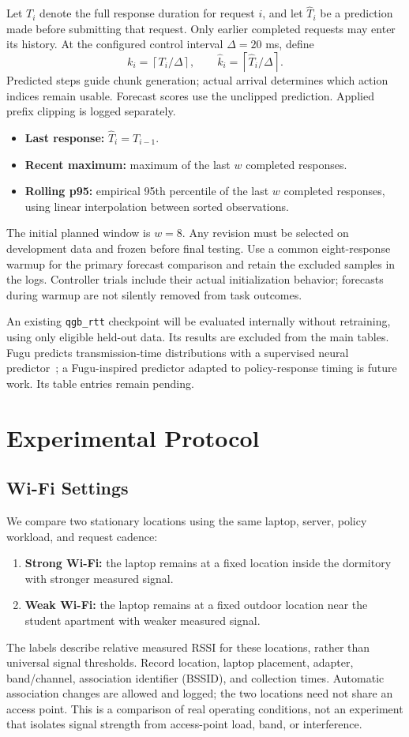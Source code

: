 \documentclass[11pt]{article}
\newcommand{\method}[1]{\texttt{#1}}
\begin{document}
Let $T_i$ denote the full response duration for request $i$, and let $\hat T_i$ be a prediction made before submitting that request. Only earlier completed requests may enter its history. At the configured control interval $\Delta=20$ ms, define
\[
 k_i=\left\lceil T_i/\Delta\right\rceil,\qquad
 \hat k_i=\left\lceil \hat T_i/\Delta\right\rceil.
\]
Predicted steps guide chunk generation; actual arrival determines which action indices remain usable. Forecast scores use the unclipped prediction. Applied prefix clipping is logged separately.

\begin{itemize}
\item \textbf{Last response:} $\hat T_i=T_{i-1}$.
\item \textbf{Recent maximum:} maximum of the last $w$ completed responses.
\item \textbf{Rolling p95:} empirical 95th percentile of the last $w$ completed responses, using linear interpolation between sorted observations.
\end{itemize}
The initial planned window is $w=8$. Any revision must be selected on development data and frozen before final testing. Use a common eight-response warmup for the primary forecast comparison and retain the excluded samples in the logs. Controller trials include their actual initialization behavior; forecasts during warmup are not silently removed from task outcomes.

An existing \method{qgb\_rtt} checkpoint will be evaluated internally without retraining, using only eligible held-out data. Its results are excluded from the main tables. Fugu predicts transmission-time distributions with a supervised neural predictor~\cite{fugu}; a Fugu-inspired predictor adapted to policy-response timing is future work. Its table entries remain pending.

\section{Experimental Protocol}
\subsection{Wi-Fi Settings}
We compare two stationary locations using the same laptop, server, policy workload, and request cadence:
\begin{enumerate}
\item \textbf{Strong Wi-Fi:} the laptop remains at a fixed location inside the dormitory with stronger measured signal.
\item \textbf{Weak Wi-Fi:} the laptop remains at a fixed outdoor location near the student apartment with weaker measured signal.
\end{enumerate}
The labels describe relative measured RSSI for these locations, rather than universal signal thresholds. Record location, laptop placement, adapter, band/channel, association identifier (BSSID), and collection times. Automatic association changes are allowed and logged; the two locations need not share an access point. This is a comparison of real operating conditions, not an experiment that isolates signal strength from access-point load, band, or interference.
\end{document}
